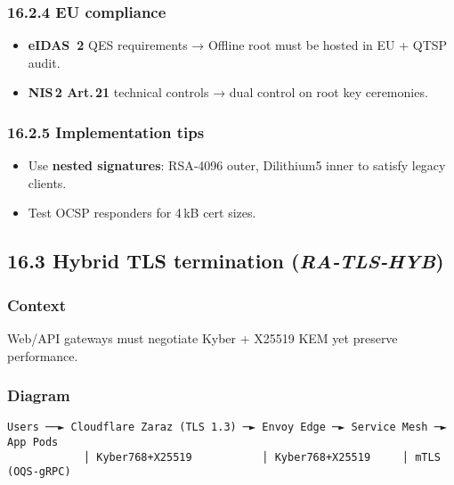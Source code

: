 \documentclass[
  english,
]{article}
\providecommand{\tightlist}{%
  \setlength{\itemsep}{0pt}\setlength{\parskip}{0pt}}
\begin{document}
\subsubsection{16.2.4 EU compliance}\label{eu-compliance}

\begin{itemize}
\tightlist
\item
  \textbf{eIDAS~2} QES requirements → Offline root must be hosted in EU
  + QTSP audit.
\item
  \textbf{NIS\,2 Art.\,21} technical controls → dual control on root key
  ceremonies.
\end{itemize}

\subsubsection{16.2.5 Implementation tips}\label{implementation-tips}

\begin{itemize}
\tightlist
\item
  Use \textbf{nested signatures}: RSA‑4096 outer, Dilithium5 inner to
  satisfy legacy clients.
\item
  Test OCSP responders for 4\,kB cert sizes.
\end{itemize}

\subsection{\texorpdfstring{16.3 Hybrid TLS termination
(\emph{RA‑TLS‑HYB})}{16.3 Hybrid TLS termination (RA‑TLS‑HYB)}}\label{hybrid-tls-termination-ratlshyb}

\subsubsection{Context}\label{context-1}

Web/API gateways must negotiate Kyber + X25519 KEM yet preserve
performance.

\subsubsection{Diagram}\label{diagram-1}

\begin{verbatim}
Users ──► Cloudflare Zaraz (TLS 1.3) ─► Envoy Edge ─► Service Mesh ─► App Pods
            │ Kyber768+X25519           │ Kyber768+X25519     │ mTLS (OQS‑gRPC)
\end{verbatim}
\end{document}
